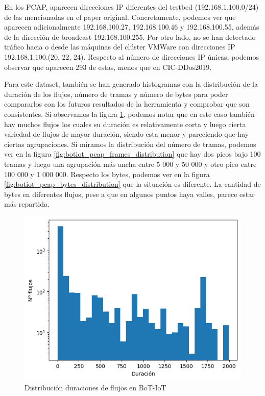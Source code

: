 En los PCAP, aparecen direcciones IP diferentes del testbed (192.168.1.100.0/24) de las mencionadas en el paper original. Concretamente, podemos ver que aparecen adicionalmente 192.168.100.27, 192.168.100.46 y 192.168.100.55, además de la dirección de broadcast 192.168.100.255. Por otro lado, no se han detectado tráfico hacia o desde las máquinas del clúster VMWare con direcciones IP 192.168.1.100.(20, 22, 24). Respecto al número de direcciones IP únicas, podemos observar que aparecen 293 de estas, menos que en CIC-DDos2019.


Para este dataset, también se han generado histogramas con la distribución de la duración de los flujos, número de tramas y número de bytes para poder compararlos con los futuros resultados de la herramienta y comprobar que son consistentes. Si observamos la figura \ref{fig:botiot_pcap_duration_distribution}, podemos notar que en este caso también hay muchos flujos los cuales su duración es relativamente corta y luego cierta variedad de flujos de mayor duración, siendo esta menor y pareciendo que hay ciertas agrupaciones. Si miramos la distribución del número de tramas, podemos ver en la figura \ref{fig:botiot_pcap_frames_distribution} que hay dos picos bajo 100 tramas y luego una agrupación más ancha entre 5 000 y  50 000 y otro pico entre 100 000 y 1 000 000. Respecto los bytes, podemos ver en la figura \ref{fig:botiot_pcap_bytes_distribution} que la situación es diferente. La cantidad de bytes en diferentes flujos, pese a que en algunos puntos haya valles, parece estar más repartida.


\begin{figure}[H]
    \begin{center}
        \includegraphics[width=0.40\linewidth]{media/botiot_pcap_duration_distribution.png}
    \end{center}
    \captionsetup{justification=centering}
    \caption{Distribución duraciones de flujos en BoT-IoT}\label{fig:botiot_pcap_duration_distribution}
\end{figure}

